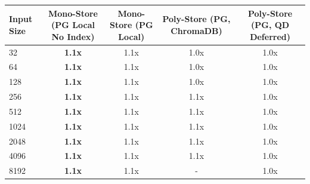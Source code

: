 \begin{tabular}{lcccc}
\toprule
\textbf{Input Size} & \textbf{Mono-Store (PG Local No Index)} & \textbf{Mono-Store (PG Local)} & \textbf{Poly-Store (PG, ChromaDB)} & \textbf{Poly-Store (PG, QD Deferred)} \\
\midrule
32 & \textbf{1.1x} & 1.1x & 1.0x & 1.0x \\
64 & \textbf{1.1x} & 1.1x & 1.0x & 1.0x \\
128 & \textbf{1.1x} & 1.1x & 1.0x & 1.0x \\
256 & \textbf{1.1x} & 1.1x & 1.1x & 1.0x \\
512 & \textbf{1.1x} & 1.1x & 1.1x & 1.0x \\
1024 & \textbf{1.1x} & 1.1x & 1.1x & 1.0x \\
2048 & \textbf{1.1x} & 1.1x & 1.1x & 1.0x \\
4096 & \textbf{1.1x} & 1.1x & 1.1x & 1.0x \\
8192 & \textbf{1.1x} & 1.1x & - & 1.0x \\
\bottomrule
\end{tabular}

